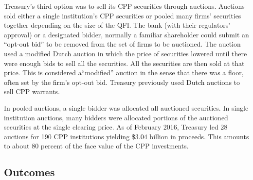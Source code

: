 \documentclass[12pt]{article}
\begin{document}
Treasury's third option was to sell its CPP securities through auctions. Auctions sold either a single institution's CPP securities or pooled many firms' securities together depending on the size of the QFI. The bank (with their regulators' approval) or a designated bidder, normally a familiar shareholder could submit an ``opt-out bid'' to be removed from the set of firms to be auctioned. The auction used a modified Dutch auction in which the price of securities lowered until there were enough bids to sell all the securities. All the securities are then sold at that price. This is considered a``modified'' auction in the sense that there was a floor, often set by the firm's opt-out bid. Treasury previously used Dutch auctions to sell CPP warrants. 

In pooled auctions, a single bidder was allocated all auctioned securities. In single institution auctions, many bidders were allocated portions of the auctioned securities at the single clearing price. As of February 2016, Treasury led 28 auctions for 190 CPP institutions yielding \$3.04 billion in proceeds. This amounts to about 80 percent of the face value of the CPP investments. 

\subsection{Outcomes} 
\end{document}
